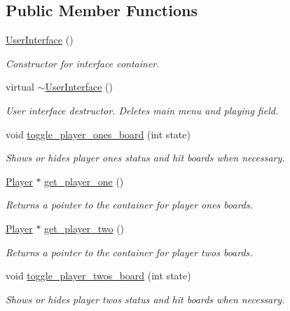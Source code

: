 \subsection*{Public Member Functions}
\begin{DoxyCompactItemize}
\item 
\mbox{\hyperlink{classUserInterface_ae6fb70370701b3bd6120e923df9705b0}{User\+Interface}} ()
\begin{DoxyCompactList}\small\item\em Constructor for interface container. \end{DoxyCompactList}\item 
\mbox{\label{classUserInterface_a7b1a866c59dbeabdd3f9ae639bc88fad}} 
virtual \mbox{\hyperlink{classUserInterface_a7b1a866c59dbeabdd3f9ae639bc88fad}{$\sim$\+User\+Interface}} ()
\begin{DoxyCompactList}\small\item\em User interface destructor. Deletes main menu and playing field. \end{DoxyCompactList}\item 
\mbox{\label{classUserInterface_a15801664af7cabbe8de8b85ce26d8225}} 
void \mbox{\hyperlink{classUserInterface_a15801664af7cabbe8de8b85ce26d8225}{toggle\+\_\+player\+\_\+ones\+\_\+board}} (int state)
\begin{DoxyCompactList}\small\item\em Shows or hides player one\textquotesingle{}s status and hit boards when necessary. \end{DoxyCompactList}\item 
\mbox{\hyperlink{classPlayer}{Player}} $\ast$ \mbox{\hyperlink{classUserInterface_a3d06cc28243bc3807a2a713de016d657}{get\+\_\+player\+\_\+one}} ()
\begin{DoxyCompactList}\small\item\em Returns a pointer to the container for player one\textquotesingle{}s boards. \end{DoxyCompactList}\item 
\mbox{\hyperlink{classPlayer}{Player}} $\ast$ \mbox{\hyperlink{classUserInterface_ac3c8fb7db84da49682117ae0ff140ea9}{get\+\_\+player\+\_\+two}} ()
\begin{DoxyCompactList}\small\item\em Returns a pointer to the container for player two\textquotesingle{}s boards. \end{DoxyCompactList}\item 
\mbox{\label{classUserInterface_a11abc3eceb9bc60bf85cde0bd68d2879}} 
void \mbox{\hyperlink{classUserInterface_a11abc3eceb9bc60bf85cde0bd68d2879}{toggle\+\_\+player\+\_\+twos\+\_\+board}} (int state)
\begin{DoxyCompactList}\small\item\em Shows or hides player two\textquotesingle{}s status and hit boards when necessary. \end{DoxyCompactList}\end{DoxyCompactItemize}
